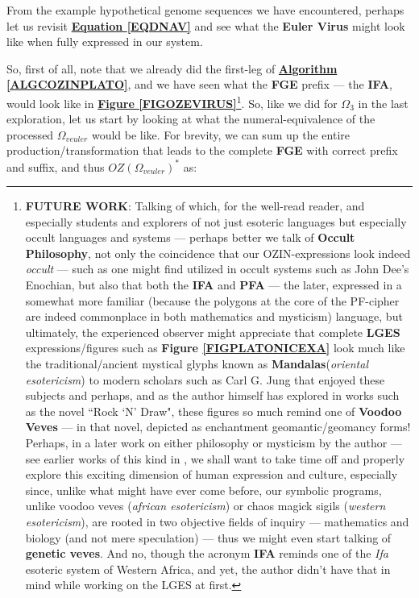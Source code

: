 \documentclass[a4paper, 18pt]{book} %
\begin{document}
From the example hypothetical genome sequences we have encountered, perhaps let us revisit \textbf{\hyperref[EQDNAV]{Equation \ref{EQDNAV}}} and see what the \textbf{Euler Virus} might look like when fully expressed in our system.

So, first of all, note that we already did the first-leg of \textbf{\hyperref[ALGCOZINPLATO]{Algorithm \ref{ALGCOZINPLATO}}}, and we have seen what the \textbf{FGE} prefix --- the \textbf{IFA}, would look like in \textbf{\hyperref[FIGOZEVIRUS]{Figure \ref{FIGOZEVIRUS}}}\footnote{\textbf{FUTURE WORK}: Talking of which, for the well-read reader, and especially students and explorers of not just esoteric languages but especially occult languages and systems --- perhaps better we talk of \textbf{Occult Philosophy}\cite{agrippa2014occult}, not only the coincidence that our OZIN-expressions look indeed \textit{occult} --- such as one might find utilized in occult systems such as John Dee's Enochian\cite{lutalo2025unraveling}, but also that both the \textbf{IFA} and \textbf{PFA} --- the later, expressed in a somewhat more familiar (because the polygons at the core of the PF-cipher are indeed commonplace in both mathematics and mysticism) language, but ultimately, the experienced observer might appreciate that complete \textbf{LGES} expressions/figures such as \textbf{Figure \ref{FIGPLATONICEXA}} look much like the traditional/ancient mystical glyphs known as \textbf{Mandalas}(\textit{oriental esotericism}) to modern scholars such as Carl G. Jung that enjoyed these subjects\cite{jung1964symbols} and perhaps, and as the author himself has explored in works such as the novel ``Rock `N' Draw"\cite{lutalo2025rock}, these figures so much remind one of \textbf{Voodoo Veves} --- in that novel, depicted as enchantment geomantic/geomancy forms! Perhaps, in a later work on either philosophy or mysticism by the author --- see earlier works of this kind in \cite{lutalo2025concerning_trans}, we shall want to take time off and properly explore this exciting dimension of human expression and culture, especially since, unlike what might have ever come before, our symbolic programs, unlike voodoo veves (\textit{african esotericism}) or chaos magick sigils (\textit{western esotericism}), are rooted in two objective fields of inquiry --- mathematics and biology (and not mere speculation) --- thus we might even start talking of \textbf{genetic veves}. And no, though the acronym \textbf{IFA} reminds one of the \textit{Ifa} esoteric system of  Western Africa, and yet, the author didn't have that in mind while working on the LGES at first.}. So, like we did for $\Omega_{3}$ in the last exploration, let us start by looking at what the numeral-equivalence of the processed $\Omega_{veuler}$ would be like. For brevity, we can sum up the entire production/transformation that leads to the complete \textbf{FGE} with correct prefix and suffix, and thus $\boxed{OZ(\Omega_{veuler})}^*$ as:
\end{document}

